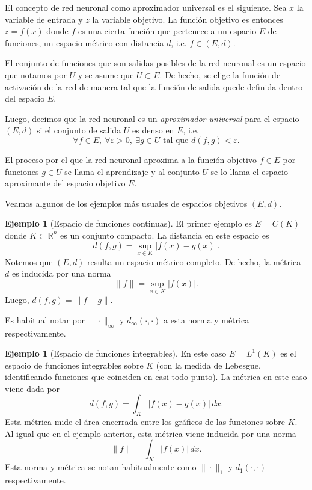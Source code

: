 \documentclass[12pt, a4paper]{amsbook}
\newcommand{\ve}{\varepsilon}
\newcommand{\R}{{\mathbb R}}
\theoremstyle{remark}
\theoremstyle{definition}
\newtheorem{ejem}[teo]{Ejemplo}
\numberwithin{section}{chapter}
\numberwithin{subsection}{section}
\numberwithin{equation}{section}
\numberwithin{figure}{chapter}
\begin{document}
El concepto de red neuronal como aproximador universal es el siguiente. Sea $x$ la variable de entrada y $z$ la variable objetivo. La función objetivo es entonces $z=f(x)$ donde $f$ es una cierta función que pertenece a un espacio $E$ de funciones, un espacio métrico con distancia $d$, i.e. $f\in (E, d)$.

El conjunto de funciones que son salidas posibles de la red neuronal es un espacio que notamos por $U$ y se asume que $U\subset E$. De hecho, se elige la función de activación de la red de manera tal que la función de salida quede definida dentro del espacio $E$.

Luego, decimos que la red neuronal es un {\em aproximador universal} para el espacio $(E, d)$ si el conjunto de salida $U$ es denso en $E$, i.e.
$$
\forall f\in E,\ \forall \ve>0,\ \exists g\in U \text{ tal que } d(f, g)<\ve.
$$

El proceso por el que la red neuronal aproxima a la función objetivo $f\in E$ por funciones $g\in U$ se llama el aprendizaje y al conjunto $U$ se lo llama el espacio aproximante del espacio objetivo $E$.

Veamos algunos de los ejemplos más usuales de espacios objetivos $(E,  d)$.

\begin{ejem}[Espacio de funciones continuas]
El primer ejemplo es $E=C(K)$ donde $K\subset \R^n$ es un conjunto compacto. La distancia en este espacio es
$$
d(f, g) = \sup_{x\in K} |f(x)-g(x)|.
$$
Notemos que $(E, d)$ resulta un espacio métrico completo. De hecho, la métrica $d$ es inducida por una norma
$$
\|f\| = \sup_{x\in K} |f(x)|.
$$
Luego, $d(f, g) = \|f-g\|$.

Es habitual notar por $\|\cdot\|_\infty$ y $d_\infty(\cdot, \cdot)$ a esta norma y métrica respectivamente.
\end{ejem}

\begin{ejem}[Espacio de funciones integrables]
En este caso $E=L^1(K)$ es el espacio de funciones integrables sobre $K$ (con la medida de Lebesgue, identificando funciones que coinciden en casi todo punto). La métrica en este caso viene dada por
$$
d(f, g) = \int_K |f(x)-g(x)|\, dx.
$$
Esta métrica mide el área encerrada entre los gráficos de las funciones sobre $K$. Al igual que en el ejemplo anterior, esta métrica viene inducida por una norma
$$
\|f\| = \int_K |f(x)|\, dx.
$$
Esta norma y métrica se notan habitualmente como $\|\cdot\|_1$ y $d_1(\cdot,\cdot)$ respectivamente.
\end{ejem}
\end{document}
